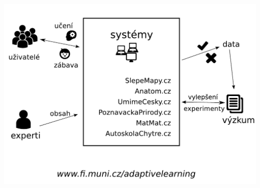 \documentclass[xcolor=svgnames]{beamer}
\begin{document}
\begin{frame}
    \includegraphics[width=\textwidth]{img/summary}
\end{frame}
\end{document}
